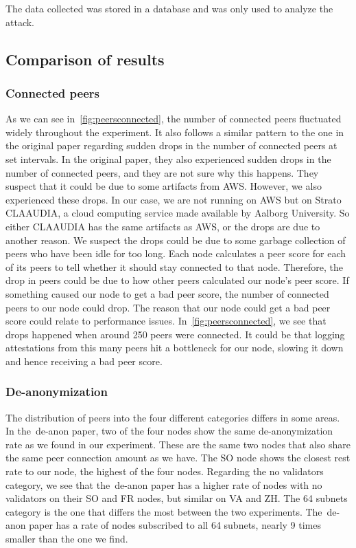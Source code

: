 The data collected was stored in a database and was only used to analyze the attack.

\subsection{Comparison of results}\label{subsec:res-comparison}

\subsubsection{Connected peers}\label{subsubsec:connected-peers}
As we can see in~\autoref{fig:peersconnected}, the number of connected peers fluctuated widely throughout the experiment.
It also follows a similar pattern to the one in the original paper regarding sudden drops in the number of connected peers at set intervals.
In the original paper, they also experienced sudden drops in the number of connected peers, and they are not sure why this happens.
They suspect that it could be due to some artifacts from AWS.
However, we also experienced these drops.
In our case, we are not running on AWS but on Strato CLAAUDIA, a cloud computing service made available by Aalborg University.
So either CLAAUDIA has the same artifacts as AWS, or the drops are due to another reason.
We suspect the drops could be due to some garbage collection of peers who have been idle for too long.
Each node calculates a peer score for each of its peers to tell whether it should stay connected to that node.
Therefore, the drop in peers could be due to how other peers calculated our node's peer score.
If something caused our node to get a bad peer score, the number of connected peers to our node could drop.
The reason that our node could get a bad peer score could relate to performance issues.
In~\autoref {fig:peersconnected}, we see that drops happened when around 250 peers were connected.
It could be that logging attestations from this many peers hit a bottleneck for our node, slowing it down and hence receiving a bad peer score.

\subsubsection{De-anonymization}\label{subsubsec:de-anonymization}
The distribution of peers into the four different categories differs in some areas.
In the~\gls{de-anon paper}, two of the four nodes show the same de-anonymization rate as we found in our experiment.
These are the same two nodes that also share the same peer connection amount as we have.
The SO node shows the closest rest rate to our node, the highest of the four nodes.
Regarding the no validators category, we see that the~\gls{de-anon paper} has a higher rate of nodes with no validators on their SO and FR nodes, but similar on VA and ZH.
The 64 subnets category is the one that differs the most between the two experiments.
The~\gls{de-anon paper} has a rate of nodes subscribed to all 64 subnets, nearly 9 times smaller than the one we find.


